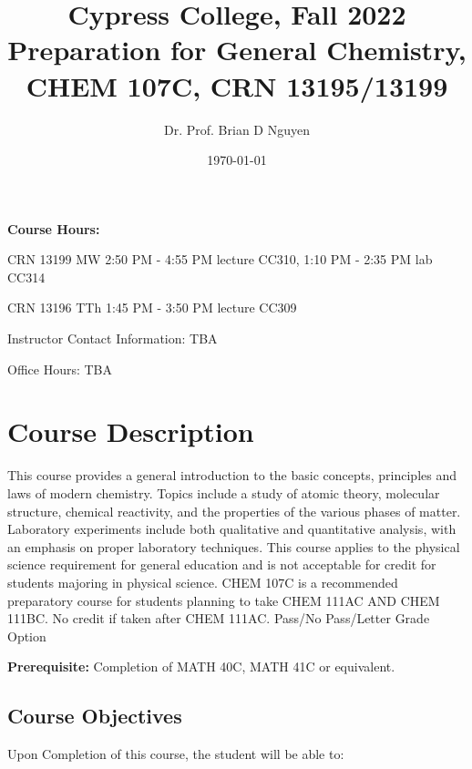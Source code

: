 \documentclass[11pt]{article}
\title{\textbf{Cypress College, Fall 2022 \\
    Preparation for General Chemistry, CHEM 107C, CRN 13195/13199}}
\author{Dr. Prof. Brian D Nguyen}
\date{\today}
\begin{document}
\maketitle 

\textbf{Course Hours:}

CRN 13199 MW 2:50 PM - 4:55 PM lecture CC310, 1:10 PM - 2:35 PM lab CC314

CRN 13196 TTh 1:45 PM - 3:50 PM lecture CC309

Instructor Contact Information: TBA

Office Hours: TBA

\section{Course Description}
This course provides a general introduction to the basic concepts, principles and laws
of modern chemistry. Topics include a study of atomic theory, molecular structure,
chemical reactivity, and the properties of the various phases of matter. Laboratory
experiments include both qualitative and quantitative analysis, with an emphasis on
proper laboratory techniques. This course applies to the physical science requirement
for general education and is not acceptable for credit for students majoring in physical
science. CHEM 107C is a recommended preparatory course for students planning to take
CHEM 111AC AND CHEM 111BC. No credit if taken after CHEM 111AC. Pass/No Pass/Letter
Grade Option

\textbf{Prerequisite:}  Completion of MATH 40C, MATH 41C or equivalent.

\subsection{Course Objectives}
Upon Completion of this course, the student will be able to:
\end{document}
